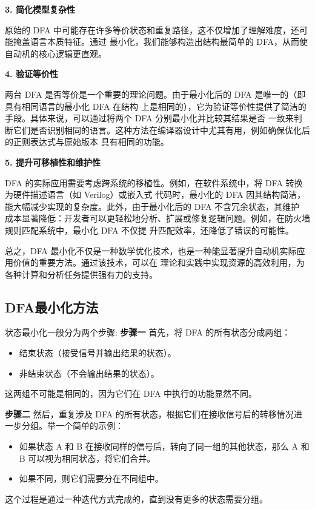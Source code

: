 \documentclass{article}
\begin{document}
\textbf{3. 简化模型复杂性}

原始的 DFA 中可能存在许多等价状态和重复路径，这不仅增加了理解难度，还可能掩盖语言本质特征。通过
最小化，我们能够构造出结构最简单的 DFA，从而使自动机的核心逻辑更直观。

\textbf{4. 验证等价性}

两台 DFA 是否等价是一个重要的理论问题。由于最小化后的 DFA 是唯一的（即具有相同语言的最小化 DFA 在结构
上是相同的），它为验证等价性提供了简洁的手段。具体来说，可以通过将两个 DFA 分别最小化并比较其结果是否
一致来判断它们是否识别相同的语言。这种方法在编译器设计中尤其有用，例如确保优化后的正则表达式与原始版本
具有相同的功能。

\textbf{5. 提升可移植性和维护性}

DFA 的实际应用需要考虑跨系统的移植性。例如，在软件系统中，将 DFA 转换为硬件描述语言（如 Verilog）或嵌入式
代码时，最小化的 DFA 因其结构简洁，能大幅减少实现的复杂度。此外，由于最小化后的 DFA 不含冗余状态，其维护
成本显著降低：开发者可以更轻松地分析、扩展或修复逻辑问题。例如，在防火墙规则匹配系统中，最小化 DFA 不仅提
升匹配效率，还降低了错误的可能性。

 总之，DFA 最小化不仅是一种数学优化技术，也是一种能显著提升自动机实际应用价值的重要方法。通过该技术，可以在
 理论和实践中实现资源的高效利用，为各种计算和分析任务提供强有力的支持。

\subsection{DFA最小化方法}
    状态最小化一般分为两个步骤:
    \textbf{步骤一}
    首先，将 DFA 的所有状态分成两组：
    \begin{itemize}
        \item 结束状态（接受信号并输出结果的状态）。
        \item 非结束状态（不会输出结果的状态）。 
    \end{itemize}
    这两组不可能是相同的，因为它们在 DFA 中执行的功能显然不同。   

    \textbf{步骤二}
    然后，重复涉及 DFA 的所有状态，根据它们在接收信号后的转移情况进一步分组。举一个简单的示例：
    \begin{itemize}
        \item 如果状态 A 和 B 在接收同样的信号后，转向了同一组的其他状态，那么 A 和 B 可以视为相同状态，将它们合并。
        \item 如果不同，则它们需要分在不同组中。
    \end{itemize}
    这个过程是通过一种迭代方式完成的，直到没有更多的状态需要分组。
\end{document}
